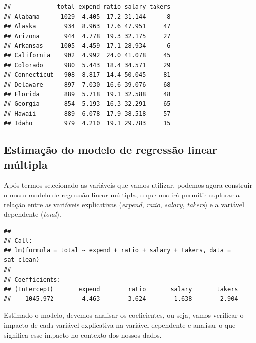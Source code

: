 \documentclass[]{article}
\begin{document}
\begin{verbatim}
##             total expend ratio salary takers
## Alabama      1029  4.405  17.2 31.144      8
## Alaska        934  8.963  17.6 47.951     47
## Arizona       944  4.778  19.3 32.175     27
## Arkansas     1005  4.459  17.1 28.934      6
## California    902  4.992  24.0 41.078     45
## Colorado      980  5.443  18.4 34.571     29
## Connecticut   908  8.817  14.4 50.045     81
## Delaware      897  7.030  16.6 39.076     68
## Florida       889  5.718  19.1 32.588     48
## Georgia       854  5.193  16.3 32.291     65
## Hawaii        889  6.078  17.9 38.518     57
## Idaho         979  4.210  19.1 29.783     15
\end{verbatim}

\subsection{Estimação do modelo de regressão linear múltipla}

Após termos selecionado as variáveis que vamos utilizar, podemos agora
construir o nosso modelo de regressão linear múltipla, o que nos irá
permitir explorar a relação entre as variáveis explicativas
(\emph{expend}, \emph{ratio}, \emph{salary}, \emph{takers}) e a variável
dependente (\emph{total}).

\begin{Shaded}
\begin{Highlighting}[]
\OtherTok{\textless{}{-}} \SpecialCharTok{\textasciitilde{}}\SpecialCharTok{+}\SpecialCharTok{+}\SpecialCharTok{+}
\end{Highlighting}
\end{Shaded}

\begin{verbatim}
## 
## Call:
## lm(formula = total ~ expend + ratio + salary + takers, data = sat_clean)
## 
## Coefficients:
## (Intercept)       expend        ratio       salary       takers  
##    1045.972        4.463       -3.624        1.638       -2.904
\end{verbatim}

Estimado o modelo, devemos analisar os coeficientes, ou seja, vamos
verificar o impacto de cada variável explicativa na variável dependente
e analisar o que significa esse impacto no contexto dos nossos dados.
\end{document}
